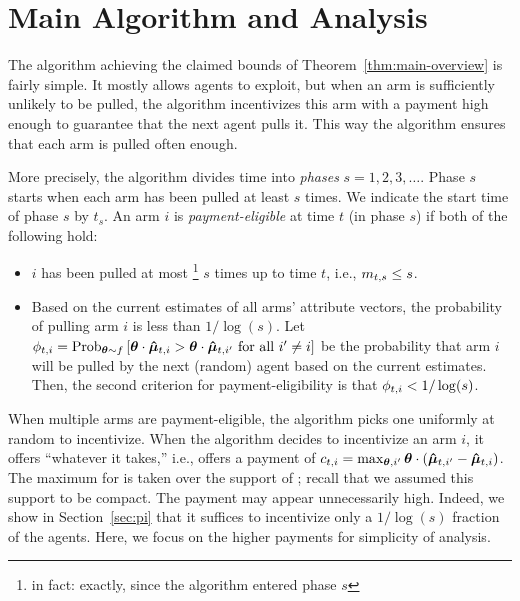 \section{Main Algorithm and Analysis}
\label{sec:ub}


The algorithm achieving the claimed bounds of
Theorem~\ref{thm:main-overview} is fairly simple.
It mostly allows agents to exploit, but when an arm is sufficiently
unlikely to be pulled, 
the algorithm incentivizes this arm with a payment high enough
to guarantee that the next agent pulls it.
This way the algorithm ensures that each arm is pulled often enough.

More precisely, the algorithm divides time into \emph{phases}
$s = 1, 2, 3, \ldots$.
Phase $s$ starts when each arm has been pulled at least $s$ times.
We indicate the start time of phase $s$ by $t_s$. An arm $i$ is \emph{payment-eligible} at time $t$ (in phase $s$)
if both of the following hold:

\begin{itemize}
\item $i$ has been pulled at most%
\footnote{in fact: exactly, since the algorithm entered phase $s$}
$s$ times up to time $t$, i.e., $m_{t,s} \leq s$.
\item Based on the current estimates  of all arms'
attribute vectors, the probability of pulling arm $i$ is less than
$1/\log(s)$. Let $\PullProb{t}{i} = \Prob[\AgV \sim \AgentDist]{\AgV \cdot \ArmEV{t}{i} > \AgV
  \cdot \ArmEV{t}{i'} \mbox{ for all } i' \neq i}$
be the probability that arm $i$ will be pulled
by the next (random) agent based on the current estimates. 
Then, the second criterion for payment-eligibility is that
$\phi_{t,i} < 1/\log(s)$.
\end{itemize}

When multiple arms are payment-eligible, the algorithm picks one
uniformly at random to incentivize.
When the algorithm decides to incentivize an arm $i$,
it offers ``whatever it takes,'' i.e., offers a payment of
$c_{t,i} = \max_{\bm{\theta},i'} \bm{\theta} \cdot (\bm{\hat{\mu}}_{t,i'} - \bm{\hat{\mu}}_{t,i})$.
The maximum for \AgV is taken over the support of \AgentDist;
recall that we assumed this support to be compact.
The payment  may appear unnecessarily high.
Indeed, we show in Section~\ref{sec:pi} that it suffices to
incentivize only a $1/\log(s)$ fraction of the agents.
Here, we focus on the higher payments for simplicity of analysis.

